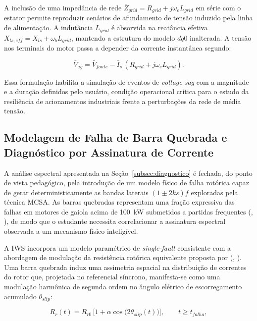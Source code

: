 \documentclass[a4paper]{ifacconf}
\begin{document}
A inclusão de uma impedância de rede $\bar{Z}_{grid} = R_{grid} + j\omega_e L_{grid}$ em série com o estator permite reproduzir cenários de afundamento de tensão induzido pela linha de alimentação. A indutância $L_{grid}$ é absorvida na reatância efetiva $X_{ls,eff} = X_{ls} + \omega_b L_{grid}$, mantendo a estrutura do modelo $dq0$ inalterada. A tensão nos terminais do motor passa a depender da corrente instantânea segundo:

\begin{equation}
\label{eq:vag_grid}
\bar{V}_{ag} = \bar{V}_{fonte} - \bar{I}_s\,(R_{grid} + j\omega_e L_{grid}).
\end{equation}

\noindent Essa formulação habilita a simulação de eventos de \textit{voltage sag} com a magnitude e a duração definidos pelo usuário, condição operacional crítica para o estudo da resiliência de acionamentos industriais frente a perturbações da rede de média tensão.

\subsection{Modelagem de Falha de Barra Quebrada e Diagnóstico por Assinatura de Corrente}
\label{subsec:barra_quebrada}

A análise espectral apresentada na Seção~\ref{subsec:diagnostico} é fechada, do ponto de vista pedagógico, pela introdução de um modelo físico de falha rotórica capaz de gerar deterministicamente as bandas laterais $(1 \pm 2ks)f$ exploradas pela técnica MCSA. As barras quebradas representam uma fração expressiva das falhas em motores de gaiola acima de 100~kW submetidos a partidas frequentes (\citeauthor{arkan2005modelling}, \citeyear{arkan2005modelling}), de modo que o estudante necessita correlacionar a assinatura espectral observada a um mecanismo físico inteligível.

A IWS incorpora um modelo paramétrico de \textit{single-fault} consistente com a abordagem de modulação da resistência rotórica equivalente proposta por (\citeauthor{tuanmohamad2024advance}, \citeyear{tuanmohamad2024advance}). Uma barra quebrada induz uma assimetria espacial na distribuição de correntes do rotor que, projetada no referencial síncrono, manifesta-se como uma modulação harmônica de segunda ordem no ângulo elétrico de escorregamento acumulado $\theta_{slip}$:

\begin{equation}
\label{eq:broken_bar}
R_r(t) = R_{r0}\,\bigl[1 + \alpha\cos\!\bigl(2\theta_{slip}(t)\bigr)\bigr], \qquad t \geq t_{falha},
\end{equation}
\end{document}
